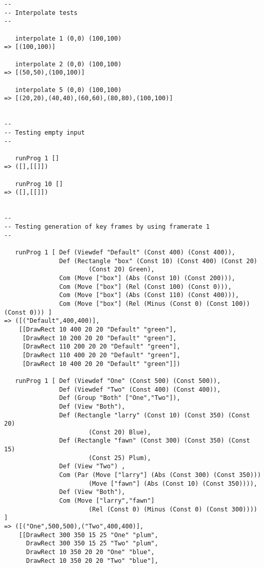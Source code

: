 \documentclass[
paper=a4,
oneside,
fontsize=11pt,
numbers=noenddot,
headinclude=false, %
footinclude=false, %
fleqn,             %
DIV=8
]{scrartcl}
\begin{document}
\begin{lstlisting}[caption=Test output for manual interpreter testing (pretty printed), label=lst:testoutinterp]
--
-- Interpolate tests
--

   interpolate 1 (0,0) (100,100)
=> [(100,100)]

   interpolate 2 (0,0) (100,100)
=> [(50,50),(100,100)]

   interpolate 5 (0,0) (100,100)
=> [(20,20),(40,40),(60,60),(80,80),(100,100)]


--
-- Testing empty input
--

   runProg 1 []
=> ([],[[]])

   runProg 10 []
=> ([],[[]])


--
-- Testing generation of key frames by using framerate 1
--

   runProg 1 [ Def (Viewdef "Default" (Const 400) (Const 400)),
               Def (Rectangle "box" (Const 10) (Const 400) (Const 20)
                       (Const 20) Green),
               Com (Move ["box"] (Abs (Const 10) (Const 200))),
               Com (Move ["box"] (Rel (Const 100) (Const 0))),
               Com (Move ["box"] (Abs (Const 110) (Const 400))),
               Com (Move ["box"] (Rel (Minus (Const 0) (Const 100)) (Const 0))) ]
=> ([("Default",400,400)],
    [[DrawRect 10 400 20 20 "Default" "green"],
     [DrawRect 10 200 20 20 "Default" "green"],
     [DrawRect 110 200 20 20 "Default" "green"],
     [DrawRect 110 400 20 20 "Default" "green"],
     [DrawRect 10 400 20 20 "Default" "green"]])

   runProg 1 [ Def (Viewdef "One" (Const 500) (Const 500)),
               Def (Viewdef "Two" (Const 400) (Const 400)),
               Def (Group "Both" ["One","Two"]),
               Def (View "Both"),
               Def (Rectangle "larry" (Const 10) (Const 350) (Const 20)
                       (Const 20) Blue),
               Def (Rectangle "fawn" (Const 300) (Const 350) (Const 15)
                       (Const 25) Plum),
               Def (View "Two") ,
               Com (Par (Move ["larry"] (Abs (Const 300) (Const 350)))
                       (Move ["fawn"] (Abs (Const 10) (Const 350)))),
               Def (View "Both"),
               Com (Move ["larry","fawn"]
                       (Rel (Const 0) (Minus (Const 0) (Const 300)))) ]
=> ([("One",500,500),("Two",400,400)],
    [[DrawRect 300 350 15 25 "One" "plum",
      DrawRect 300 350 15 25 "Two" "plum",
      DrawRect 10 350 20 20 "One" "blue",
      DrawRect 10 350 20 20 "Two" "blue"],


\end{lstlisting}
\end{document}

